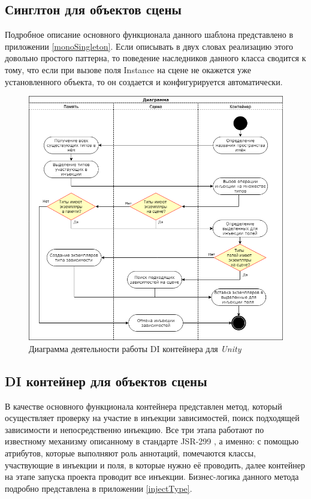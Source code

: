 \subsection{Синглтон для объектов сцены}
Подробное описание основного функционала данного шаблона представлено в приложении \ref{monoSingleton}. Если описывать в двух словах реализацию этого довольно простого паттерна, то поведение наследников данного класса сводится к тому, что если при вызове поля Instance на сцене не окажется уже установленного объекта, то он создается и конфигурируется автоматически.

\begin{figure}[h]
	\centering
	\includegraphics[width=\linewidth]{containerDI.png}
	\caption{Диаграмма деятельности работы DI контейнера для \textit{Unity}}
	\label{injectionIllustration}
\end{figure}

\subsection{DI контейнер для объектов сцены}
В качестве основного функционала контейнера представлен метод, который осуществляет проверку на участие в инъекции зависимостей, поиск подходящей зависимости и непосредственно инъекцию. Все три этапа работают по известному механизму описанному в стандарте JSR-299 \cite{jsr}, а именно: с помощью атрибутов, которые выполняют роль аннотаций, помечаются классы, участвующие в инъекции и поля, в которые нужно её проводить, далее контейнер на этапе запуска проекта проводит все инъекции. Бизнес-логика данного метода подробно представлена в приложении \ref{injectType}.

